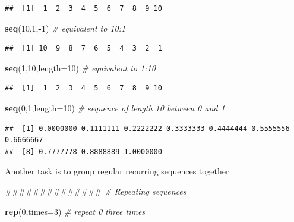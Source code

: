 \documentclass[]{article}
\newenvironment{Shaded}{\begin{snugshade}}{\end{snugshade}}
\newcommand{\KeywordTok}[1]{\textcolor[rgb]{0.13,0.29,0.53}{\textbf{#1}}}
\newcommand{\DataTypeTok}[1]{\textcolor[rgb]{0.13,0.29,0.53}{#1}}
\newcommand{\DecValTok}[1]{\textcolor[rgb]{0.00,0.00,0.81}{#1}}
\newcommand{\CommentTok}[1]{\textcolor[rgb]{0.56,0.35,0.01}{\textit{#1}}}
\newcommand{\OperatorTok}[1]{\textcolor[rgb]{0.81,0.36,0.00}{\textbf{#1}}}
\newcommand{\NormalTok}[1]{#1}
\begin{document}
\begin{verbatim}
##  [1]  1  2  3  4  5  6  7  8  9 10
\end{verbatim}

\begin{Shaded}
\begin{Highlighting}[]
\KeywordTok{seq}\NormalTok{(}\DecValTok{10}\NormalTok{,}\DecValTok{1}\NormalTok{,}\OperatorTok{-}\DecValTok{1}\NormalTok{)                }\CommentTok{# equivalent to 10:1}
\end{Highlighting}
\end{Shaded}

\begin{verbatim}
##  [1] 10  9  8  7  6  5  4  3  2  1
\end{verbatim}

\begin{Shaded}
\begin{Highlighting}[]
\KeywordTok{seq}\NormalTok{(}\DecValTok{1}\NormalTok{,}\DecValTok{10}\NormalTok{,}\DataTypeTok{length=}\DecValTok{10}\NormalTok{)         }\CommentTok{# equivalent to 1:10}
\end{Highlighting}
\end{Shaded}

\begin{verbatim}
##  [1]  1  2  3  4  5  6  7  8  9 10
\end{verbatim}

\begin{Shaded}
\begin{Highlighting}[]
\KeywordTok{seq}\NormalTok{(}\DecValTok{0}\NormalTok{,}\DecValTok{1}\NormalTok{,}\DataTypeTok{length=}\DecValTok{10}\NormalTok{)          }\CommentTok{# sequence of length 10 between 0 and 1 }
\end{Highlighting}
\end{Shaded}

\begin{verbatim}
##  [1] 0.0000000 0.1111111 0.2222222 0.3333333 0.4444444 0.5555556 0.6666667
##  [8] 0.7777778 0.8888889 1.0000000
\end{verbatim}

Another task is to group regular recurring sequences together:

\begin{Shaded}
\begin{Highlighting}[]
\NormalTok{##############}
\CommentTok{# Repeating sequences}

\KeywordTok{rep}\NormalTok{(}\DecValTok{0}\NormalTok{,}\DataTypeTok{times=}\DecValTok{3}\NormalTok{)                }\CommentTok{# repeat 0 three times}
\end{Highlighting}
\end{Shaded}
\end{document}
